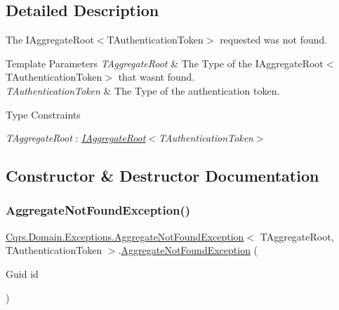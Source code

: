 \subsection{Detailed Description}
The I\+Aggregate\+Root$<$\+T\+Authentication\+Token$>$ requested was not found. 


\begin{DoxyTemplParams}{Template Parameters}
{\em T\+Aggregate\+Root} & The Type of the I\+Aggregate\+Root$<$\+T\+Authentication\+Token$>$ that wasn\textquotesingle{}t found.\\
\hline
{\em T\+Authentication\+Token} & The Type of the authentication token.\\
\hline
\end{DoxyTemplParams}
\begin{Desc}
\item[Type Constraints]\begin{description}
\item[{\em T\+Aggregate\+Root} : {\em \hyperlink{interfaceCqrs_1_1Domain_1_1IAggregateRoot}{I\+Aggregate\+Root}$<$T\+Authentication\+Token$>$}]\end{description}
\end{Desc}


\subsection{Constructor \& Destructor Documentation}
\mbox{\label{classCqrs_1_1Domain_1_1Exceptions_1_1AggregateNotFoundException_a44057befbb31c652727d04c5b34211ee_a44057befbb31c652727d04c5b34211ee}} 
\subsubsection{\texorpdfstring{Aggregate\+Not\+Found\+Exception()}{AggregateNotFoundException()}}
{\footnotesize\ttfamily \hyperlink{classCqrs_1_1Domain_1_1Exceptions_1_1AggregateNotFoundException}{Cqrs.\+Domain.\+Exceptions.\+Aggregate\+Not\+Found\+Exception}$<$ T\+Aggregate\+Root, T\+Authentication\+Token $>$.\hyperlink{classCqrs_1_1Domain_1_1Exceptions_1_1AggregateNotFoundException}{Aggregate\+Not\+Found\+Exception} (\begin{DoxyParamCaption}\item[{Guid}]{id }\end{DoxyParamCaption})}



